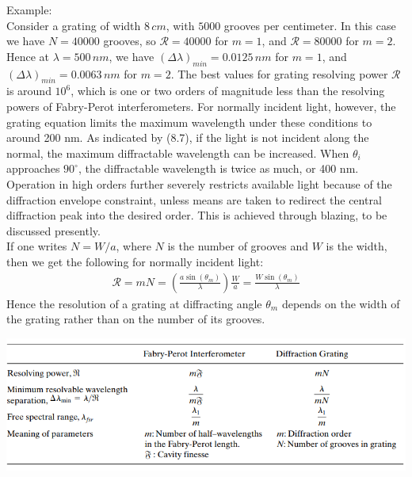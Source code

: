 \documentclass[11pt]{book}
\theoremstyle{break}
\theoremstyle{break}
\newcommand{\example}{\color{green}Example: \color{black}}
\begin{document}
\example\\
Consider a grating of width $8\, cm$, with $5000 $ grooves per centimeter. In this case we have $N= 40000$ grooves, so $\mathcal{R} = 40000$ for $m=1$, and $\mathcal{R} = 80000$ for $m=2$. Hence at $\lambda = 500\, nm$, we have $(\Delta \lambda)_{min} = 0.0125\, nm$ for $m=1$, and $(\Delta \lambda)_{min} = 0.0063\, nm$ for $m=2$. The best values for grating resolving power $\mathcal{R}$ is around $10^6$, which is one or two orders of magnitude less than the
resolving powers of Fabry-Perot interferometers. For normally incident light, however, the grating
equation limits the maximum wavelength under these conditions to around 200 nm. As indicated by (8.7), if the light is not incident along the normal, the maximum diffractable wavelength can be increased. When $\theta_i$ approaches $90^\circ$, the diffractable wavelength is twice as much, or 400 nm. Operation in high orders further severely restricts
available light because of the diffraction envelope constraint, unless means are taken to redirect the central diffraction peak into the desired order. This is achieved through blazing, to be discussed presently.\\

If one writes $N = W/a$, where $N$ is the number of grooves and $W$ is the width, then we get the following for normally incident light:
\begin{align*}
\mathcal{R} = mN = \left( \frac{a\sin(\theta_m)}{\lambda}\right) \frac{W}{a} = \frac{W \sin(\theta_m)}{\lambda}
\end{align*}
Hence the resolution of a grating at diffracting angle $\theta_m$ depends on the width of the grating rather than on the number of its grooves.
\begin{center}
\includegraphics[scale=0.8]{FBvsGra}
\end{center}
\newpage
\end{document}
